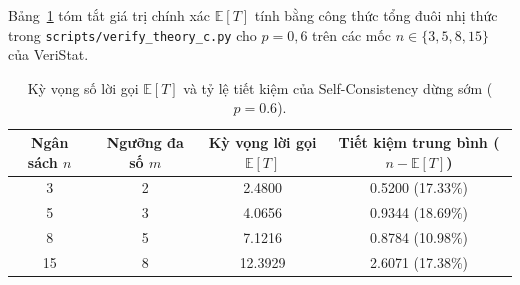 Bảng~\ref{tab:b5-verify} tóm tắt giá trị chính xác $\mathbb{E}[T]$ tính bằng công thức tổng đuôi nhị thức trong \texttt{scripts/verify\_theory\_c.py} cho $p = 0{,}6$ trên các mốc $n \in \{3, 5, 8, 15\}$ của VeriStat.

\begin{table}[htbp]
  \centering
  \caption{Kỳ vọng số lời gọi $\mathbb{E}[T]$ và tỷ lệ tiết kiệm của Self-Consistency dừng sớm ($p = 0.6$).}
  \label{tab:b5-verify}
  \begin{tabular}{cccc}
    \toprule
    Ngân sách $n$ & Ngưỡng đa số $m$ & Kỳ vọng lời gọi $\mathbb{E}[T]$ & Tiết kiệm trung bình ($n - \mathbb{E}[T]$) \\
    \midrule
    3  & 2 & 2.4800 & 0.5200 (17.33\%) \\
    5  & 3 & 4.0656 & 0.9344 (18.69\%) \\
    8  & 5 & 7.1216 & 0.8784 (10.98\%) \\
    15 & 8 & 12.3929 & 2.6071 (17.38\%) \\
    \bottomrule
  \end{tabular}
\end{table}
